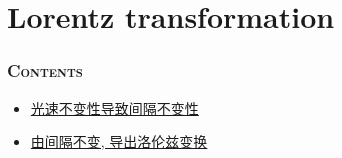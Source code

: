 \documentclass[aspectratio=169, 10pt, utf8, mathserif]{beamer}
\numberwithin{equation}{section} %
\numberwithin{figure}{section} %
\begin{document}

\section[相对论时空观的集中反映: 洛伦兹变换]{Lorentz transformation} %


\begin{frame}%
    \frametitle{\textsc{Contents}} \vspace{-0.85cm}\label{sec:2}
    \begin{multicols}{2}
    \begin{minipage}[t]{0.55\textwidth}
    \end{minipage}

    \begin{minipage}[t]{0.55\textwidth}
    \vspace{0.5cm}
    \begin{spacing}{0.9} %
    \begin{itemize}
        \item\hyperlink{subsec:2-1}{光速不变性导致间隔不变性}
        \item\hyperlink{subsec:2-2}{由间隔不变, 导出洛伦兹变换}
    \end{itemize}
    \end{spacing}
    \end{minipage}
    \end{multicols}
\end{frame}
\end{document}

